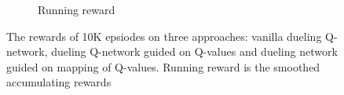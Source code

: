 \begin{figure}[h!]
\begin{subfigure}[t]{0.25\textwidth}
		\caption{Running reward}
	\end{subfigure}
	\vspace{-1mm}
	\caption{The rewards of 10K epsiodes on three approaches: vanilla dueling Q-network, dueling Q-network guided on Q-values and dueling network guided on mapping of Q-values. Running reward is the smoothed accumulating rewards}
\label{fig:mimic_result}
	\vspace{-3mm}
\end{figure}




